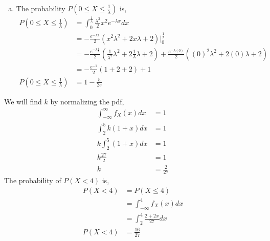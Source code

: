 \documentclass[answers]{exam}
\begin{document}
\begin{questions}
\begin{framed}
\begin{enumerate}[(a)]
            \item The probability $P(0 \leq X \leq \frac{1}{\lambda})$ is,
                  \begin{equation*}
                      \begin{split}
                          P\left(0\le X\le \frac{1}{\lambda}\right) & = \int_{0}^{\frac{1}{\lambda}}\frac{\lambda^3}{2}x^2 e^{-\lambda x}dx\\
                          & = -\frac{e^{-\lambda x}}{2}\left(x^2\lambda^2+2x\lambda+2\right)\bigg|_{0}^{\frac{1}{\lambda}}\\
                          & = -\frac{e^{-\lambda \frac{1}{\lambda}}}{2}\left(\frac{1}{\lambda^2}\lambda^2+2\frac{1}{\lambda}\lambda+2\right)+\frac{e^{-\lambda (0)}}{2}\left((0)^2\lambda^2+2(0)\lambda+2\right)\\
                          & = -\frac{e^{-1}}{2}\left(1+2+2\right)+1\\
                          P\left(0\le X\le \frac{1}{\lambda}\right) & = 1-\frac{5}{2e}
                      \end{split}
                  \end{equation*}
        \end{enumerate}
    \end{framed}


    \begin{framed}
        We will find $k$ by normalizing the pdf,
        \begin{equation*}
            \begin{split}
                \int_{-\infty}^{\infty}f_{X}(x)dx & = 1\\
                \int_{2}^{5}k(1+x)dx & = 1\\
                k\int_{2}^{5}(1+x)dx & = 1\\
                k\frac{27}{2} & = 1\\
                k & = \frac{2}{27}
            \end{split}
        \end{equation*}
        The probability of $P(X<4)$ is,
        \begin{equation*}
            \begin{split}
                P(X<4) & = P(X\le 4)\\
                & = \int_{-\infty}^{4}f_{X}(x)dx\\
                & = \int_{2}^{4}\frac{2+2x}{27}dx\\
                P(X<4) & = \frac{16}{27}
            \end{split}
        \end{equation*}
    \end{framed}


\end{questions}
\end{document}
